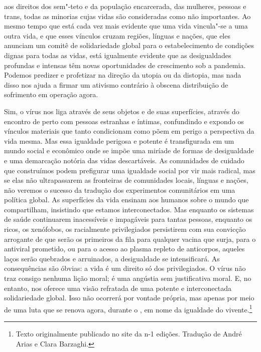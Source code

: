 aos direitos dos sem"-teto e da população encarcerada, das mulheres,
pessoas {} e trans, todas as minorias cujas vidas são
consideradas como não importantes. Ao mesmo tempo que está cada vez mais
evidente que uma vida vincula"-se a uma outra vida, e que esses vínculos
cruzam regiões, línguas e nações, que eles anunciam um comitê de
solidariedade global para o estabelecimento de condições dignas para
todas as vidas, está igualmente evidente que as desigualdades profundas
e intensas têm novas oportunidades de crescimento sob a pandemia.
Podemos predizer e profetizar na direção da utopia ou da distopia, mas
nada disso nos ajuda a firmar um ativismo contrário à obscena
distribuição de sofrimento em operação agora.

Sim, o vírus nos liga através de seus objetos e de suas superfícies,
através do encontro de perto com pessoas estranhas e íntimas,
confundindo e expondo os vínculos materiais que tanto condicionam como
põem em perigo a perspectiva da vida mesma. Mas essa igualdade perigosa
e potente é transfigurada em um mundo social e econômico onde se impõe
uma miríade de formas de desigualdade e uma demarcação notória das vidas
descartáveis. As comunidades de cuidado que construímos podem prefigurar
uma igualdade social por vir mais radical, mas se elas não ultrapassarem
as fronteiras de comunidades locais, línguas e nações, não veremos o
sucesso da tradução dos experimentos comunitários em uma política
global. As superfícies da vida ensinam aos humanos sobre o mundo que
compartilham, insistindo que estamos interconectados. Mas enquanto os
sistemas de saúde continuarem inacessíveis e impagáveis para tantas
pessoas, enquanto os ricos, os xenófobos, os racialmente privilegiados
persistirem com sua convicção arrogante de que serão os primeiros da
fila para qualquer vacina que surja, para o antiviral prometido, ou para
o acesso ao plasma repleto de anticorpos, aqueles laços serão quebrados
e arruinados, a desigualdade se intensificará. As consequências são
óbvias: a vida é um direito só dos privilegiados. O vírus não traz
consigo nenhuma lição moral; é uma angústia sem justificativa moral. E,
no entanto, nos oferece uma visão refratada de uma potente e
interconectada solidariedade global. Isso não ocorrerá por vontade
própria, mas apenas por meio de uma luta que se renova agora, durante o
{}, em nome da igualdade do vivente.\footnote{Texto originalmente publicado no site da n-1 edições. Tradução de André Arias e Clara Barzaghi.}

\pagebreak %

